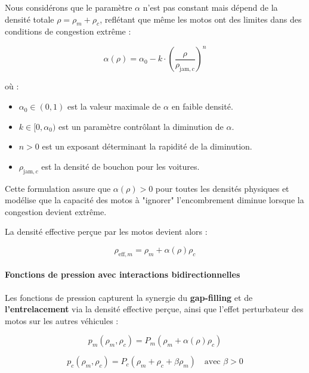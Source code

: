 Nous considérons que le paramètre $\alpha$ n'est pas constant mais dépend de la densité totale $\rho = \rho_m + \rho_c$, reflétant que même les motos ont des limites dans des conditions de congestion extrême :

\begin{equation}
    \alpha(\rho) = \alpha_0 - k \cdot \left( \frac{\rho}{\rho_{\text{jam},c}} \right)^n
\end{equation}

où :
\begin{itemize}
    \item $\alpha_0 \in (0,1)$ est la valeur maximale de $\alpha$ en faible densité.
    \item $k \in [0, \alpha_0)$ est un paramètre contrôlant la diminution de $\alpha$.
    \item $n > 0$ est un exposant déterminant la rapidité de la diminution.
    \item $\rho_{\text{jam},c}$ est la densité de bouchon pour les voitures.
\end{itemize}

Cette formulation assure que $\alpha(\rho) > 0$ pour toutes les densités physiques et modélise que la capacité des motos à "ignorer" l'encombrement diminue lorsque la congestion devient extrême.

La densité effective perçue par les motos devient alors :

\begin{equation}
    \rho_{\text{eff},m} = \rho_m + \alpha(\rho) \rho_c
\end{equation}

\paragraph{Fonctions de pression avec interactions bidirectionnelles}
Les fonctions de pression capturent la synergie du \textbf{gap-filling} et de \textbf{l'entrelacement} via la densité effective perçue, ainsi que l'effet perturbateur des motos sur les autres véhicules :

\begin{equation}
    p_m(\rho_m, \rho_c) = P_m(\rho_m + \alpha(\rho) \rho_c)
\end{equation}

\begin{equation}
    p_c(\rho_m, \rho_c) = P_c(\rho_m + \rho_c + \beta \rho_m) \quad \text{avec } \beta > 0
\end{equation}

